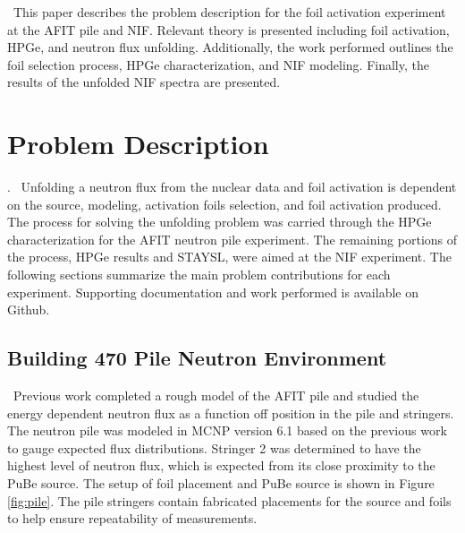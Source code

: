 \documentclass[journal]{IEEEtran}
\begin{document}
\ This paper describes the problem description for the foil activation experiment at the AFIT pile and NIF. Relevant theory is presented including foil activation, HPGe, and neutron flux unfolding. Additionally, the work performed outlines the foil selection process, HPGe characterization, and NIF modeling. Finally, the results of the unfolded NIF spectra are presented. 

\section{Problem Description}.
\ Unfolding a neutron flux from the nuclear data and foil activation is dependent on the source, modeling, activation foils selection, and foil activation produced. The process for solving the unfolding problem was carried through the HPGe characterization for the AFIT neutron pile experiment. The remaining portions of the process, HPGe results and STAYSL, were aimed at the NIF experiment. The following sections summarize the main problem contributions for each experiment.  Supporting documentation and work performed is available on Github\cite{Me}. 

\subsection{Building 470 Pile Neutron Environment }
\ Previous work completed a rough model of the AFIT pile and studied the energy dependent neutron flux as a function off position in the pile and stringers\cite{Will}. The neutron pile was modeled in MCNP version 6.1 
based on the previous work to gauge expected flux distributions\cite{MCNP}. Stringer 2 was determined to have the highest level of neutron flux, which is expected from its close proximity to the PuBe source. The setup of foil placement and PuBe source is shown in Figure \ref{fig:pile}. The pile stringers contain fabricated placements for the source and foils to help ensure repeatability of measurements. 
\end{document}
